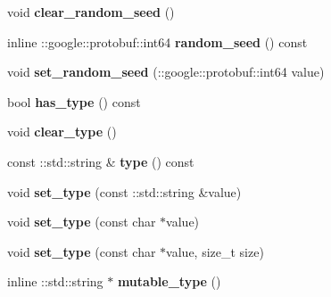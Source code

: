 \begin{DoxyCompactItemize}
void {\bfseries clear\+\_\+random\+\_\+seed} ()
\item 
\mbox{\label{classcaffe_1_1_solver_parameter_a66d314f37e686241981d3d034897caa9}} 
inline \+::google\+::protobuf\+::int64 {\bfseries random\+\_\+seed} () const
\item 
\mbox{\label{classcaffe_1_1_solver_parameter_a8ccb50c841cefd76141ba81f38dd0b05}} 
void {\bfseries set\+\_\+random\+\_\+seed} (\+::google\+::protobuf\+::int64 value)
\item 
\mbox{\label{classcaffe_1_1_solver_parameter_aa619ecd344a23debf4e396a50304bea5}} 
bool {\bfseries has\+\_\+type} () const
\item 
\mbox{\label{classcaffe_1_1_solver_parameter_ae1dba9c733d2207988246a56b84e9f3e}} 
void {\bfseries clear\+\_\+type} ()
\item 
\mbox{\label{classcaffe_1_1_solver_parameter_a294b6d584784c9f35ca69c1a058239af}} 
const \+::std\+::string \& {\bfseries type} () const
\item 
\mbox{\label{classcaffe_1_1_solver_parameter_a8cc17f2f259fe150e09200b0f00c5bf9}} 
void {\bfseries set\+\_\+type} (const \+::std\+::string \&value)
\item 
\mbox{\label{classcaffe_1_1_solver_parameter_a7481effb96c315dcf33d157da3bb0ca5}} 
void {\bfseries set\+\_\+type} (const char $\ast$value)
\item 
\mbox{\label{classcaffe_1_1_solver_parameter_a4324bac6d254e120881000c2149e2dda}} 
void {\bfseries set\+\_\+type} (const char $\ast$value, size\+\_\+t size)
\item 
\mbox{\label{classcaffe_1_1_solver_parameter_a2bd622a5e80bea90c315a5b1584b5d3c}} 
inline \+::std\+::string $\ast$ {\bfseries mutable\+\_\+type} ()
\item 
\mbox{\label{classcaffe_1_1_solver_parameter_a81a5d781eef8c25a5473d5eea718ad69}} 

\end{DoxyCompactItemize}
